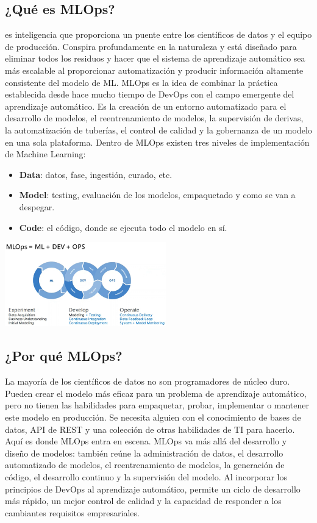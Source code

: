 \documentclass[twoside,twocolumn]{article}
\begin{document}
\subsection{¿Qué es MLOps?}
\noindent es inteligencia que proporciona un puente entre los científicos de datos y el equipo de producción. Conspira profundamente en la naturaleza y está diseñado para eliminar todos los residuos y hacer que el sistema de aprendizaje automático sea más escalable al proporcionar automatización y producir información altamente consistente del modelo de ML.
MLOps es la idea de combinar la práctica establecida desde hace mucho tiempo de DevOps con el campo emergente del aprendizaje automático. Es la creación de un entorno automatizado para el desarrollo de modelos, el reentrenamiento de modelos, la supervisión de derivas, la automatización de tuberías, el control de calidad y la gobernanza de un modelo en una sola plataforma. Dentro de MLOps existen tres niveles de implementación de Machine Learning:
\begin{itemize}
    \item \textbf{Data}: datos, fase, ingestión, curado, etc.
    \item \textbf{Model}: testing, evaluación de los modelos, empaquetado y como se van a despegar.
    \item \textbf{Code}: el código, donde se ejecuta todo el modelo en sí.
\end{itemize}
\begin{center}
    \includegraphics[width=7cm]{./img/img1.png}
\end{center}


\subsection{¿Por qué MLOps?}
\noindent La mayoría de los científicos de datos no son programadores de núcleo duro. Pueden crear el modelo más eficaz para un problema de aprendizaje automático, pero no tienen las habilidades para empaquetar, probar, implementar o mantener este modelo en producción. Se necesita alguien con el conocimiento de bases de datos, API de REST y una colección de otras habilidades de TI para hacerlo. Aquí es donde MLOps entra en escena.
MLOps va más allá del desarrollo y diseño de modelos: también reúne la administración de datos, el desarrollo automatizado de modelos, el reentrenamiento de modelos, la generación de código, el desarrollo continuo y la supervisión del modelo. Al incorporar los principios de DevOps al aprendizaje automático, permite un ciclo de desarrollo más rápido, un mejor control de calidad y la capacidad de responder a los cambiantes requisitos empresariales.
\end{document}
